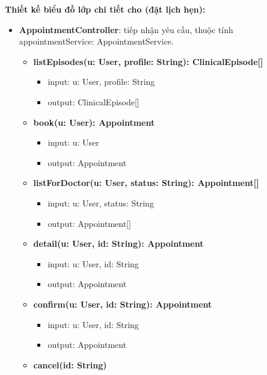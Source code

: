 \textbf{Thiết kế biểu đồ lớp chi tiết cho  (đặt lịch hẹn):}
\begin{itemize}[label=\textbullet, itemsep=0.4em]
  \item \textbf{AppointmentController}: tiếp nhận yêu cầu, thuộc tính appointmentService: AppointmentService.
  \begin{itemize}[label=$\circ$, itemsep=0.2em, leftmargin=1.5em]
    \item \textbf{listEpisodes(u: User, profile: String): ClinicalEpisode[]}
    \begin{itemize}[label=$\blacksquare$, itemsep=0.1em, leftmargin=1.5em]
      \item input: u: User, profile: String
      \item output: ClinicalEpisode[]
    \end{itemize}
    \item \textbf{book(u: User): Appointment}
    \begin{itemize}[label=$\blacksquare$, itemsep=0.1em, leftmargin=1.5em]
      \item input: u: User
      \item output: Appointment
    \end{itemize}
    \item \textbf{listForDoctor(u: User, status: String): Appointment[]}
    \begin{itemize}[label=$\blacksquare$, itemsep=0.1em, leftmargin=1.5em]
      \item input: u: User, status: String
      \item output: Appointment[]
    \end{itemize}
    \item \textbf{detail(u: User, id: String): Appointment}
    \begin{itemize}[label=$\blacksquare$, itemsep=0.1em, leftmargin=1.5em]
      \item input: u: User, id: String
      \item output: Appointment
    \end{itemize}
    \item \textbf{confirm(u: User, id: String): Appointment}
    \begin{itemize}[label=$\blacksquare$, itemsep=0.1em, leftmargin=1.5em]
      \item input: u: User, id: String
      \item output: Appointment
    \end{itemize}
    \item \textbf{cancel(id: String)}

\end{itemize}
\end{itemize}
